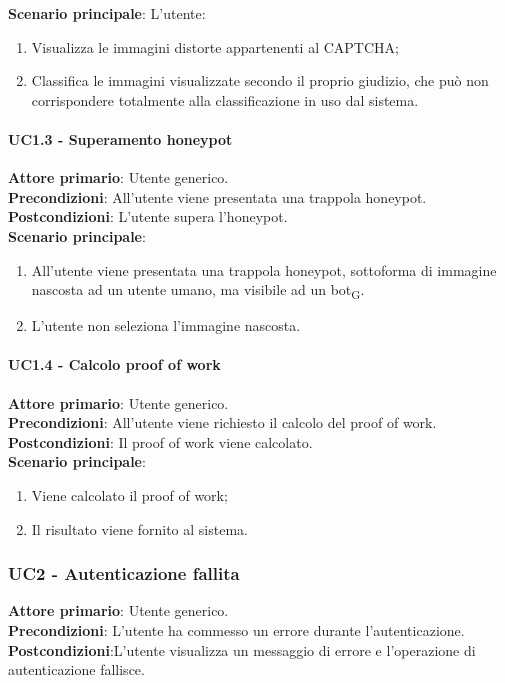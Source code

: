 \textbf{Scenario principale}: L'utente:
\begin{enumerate}
   \item Visualizza le immagini distorte appartenenti al CAPTCHA;
   \item Classifica le immagini visualizzate secondo il proprio giudizio, che può non corrispondere totalmente alla classificazione in uso dal sistema.
\end{enumerate}

\paragraph{UC1.3 - Superamento honeypot}
\textbf{Attore primario}: Utente generico.\\
\textbf{Precondizioni}: All'utente viene presentata una trappola honeypot.\\
\textbf{Postcondizioni}: L'utente supera l'honeypot.\\

\textbf{Scenario principale}:
\begin{enumerate}
   \item All'utente viene presentata una trappola honeypot, sottoforma di immagine nascosta ad un utente umano, ma visibile ad un bot\textsubscript{G}.
   \item L'utente non seleziona l'immagine nascosta.
\end{enumerate}

\paragraph{UC1.4 - Calcolo proof of work}
\textbf{Attore primario}: Utente generico.\\
\textbf{Precondizioni}: All'utente viene richiesto il calcolo del proof of work.\\
\textbf{Postcondizioni}: Il proof of work viene calcolato.\\

\textbf{Scenario principale}:
\begin{enumerate}
   \item Viene calcolato il proof of work;
   \item Il risultato viene fornito al sistema.
\end{enumerate}

\subsubsection{UC2 - Autenticazione fallita}
\textbf{Attore primario}: Utente generico.\\
\textbf{Precondizioni}: L’utente ha commesso un errore durante l'autenticazione.\\
\textbf{Postcondizioni}:L’utente visualizza un messaggio di errore e l’operazione di autenticazione fallisce.\\

